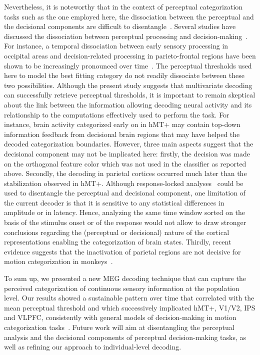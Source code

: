 Nevertheless, it is noteworthy that in the context of perceptual categorization tasks such as the one employed here, the dissociation between the perceptual and the decisional components are difficult to disentangle~\cite{mostert2015dissociating,kelly2013internal,heekeren2008neural}. Several studies have discussed the dissociation between perceptual processing and decision-making~\cite{philiastides2006temporal,philiastides2006neural,ratcliff2009quality,o2012supramodal,wyart2012rhythmic,de2013prestimulus,kelly2013internal,pitts2012visual,mostert2015dissociating}. For instance, a temporal dissociation between early sensory processing in occipital areas and decision-related processing in parieto-frontal regions have been shown to be increasingly pronounced over time~\cite{mostert2015dissociating}. The perceptual thresholds used here to model the best fitting category do not readily dissociate between these two possibilities. Although the present study suggests that multivariate decoding can successfully retrieve perceptual thresholds, it is important to remain skeptical about the link between the information allowing decoding neural activity and its relationship to the computations effectively used to perform the task. For instance, brain activity categorized early on in hMT+ may contain top-down information feedback from decisional brain regions that may have helped the decoded categorization boundaries. However, three main aspects suggest that the decisional component may not be implicated here: firstly, the decision was made on the orthogonal feature color which was not used in the classifier as reported above. Secondly, the decoding in parietal cortices occurred much later than the stabilization observed in hMT+. Although response-locked analyses~\cite{kelly2013internal} could be used to disentangle the perceptual and decisional component, one limitation of the current decoder is that it is sensitive to any statistical differences in amplitude or in latency. Hence, analyzing the same time window sorted on the basis of the stimulus onset or of the response would not allow to draw stronger conclusions regarding the (perceptual or decisional) nature of the cortical representations enabling the categorization of brain states. Thirdly, recent evidence suggests that the inactivation of parietal regions are not decisive for motion categorization in monkeys~\cite{katz2016dissociated}. 

To sum up, we presented a new MEG decoding technique that can capture the perceived categorization of continuous sensory information at the population level. Our results showed a sustainable pattern over time that correlated with the mean perceptual threshold and which successively implicated hMT+, V1/V2, IPS and VLPFC, consistently with general models of decision-making in motion categorization tasks~\cite{mazurek2003role}. Future work will aim at disentangling the perceptual analysis and the decisional components of perceptual decision-making tasks, as well as refining our approach to individual-level decoding.
